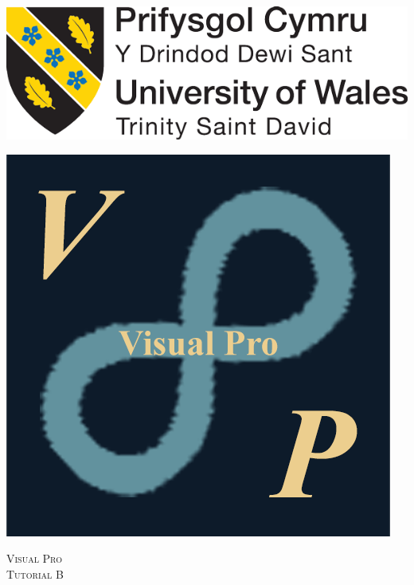 \documentclass[10pt]{article}
\begin{document}
\begin{center}																		%
\newcommand{\HRule}{\rule{\linewidth}{0.5mm}}									%
\begin{minipage}{0.48\textwidth} \begin{flushleft}
\includegraphics[scale = 0.15]{Figures/Logo/UWTSD-Logo}
\end{flushleft}\end{minipage}
\begin{minipage}{0.48\textwidth} \begin{flushright}
\includegraphics[scale = 0.4]{Figures/Logo/VP-Logo-Large}
\end{flushright}\end{minipage}

\vspace*{-1.5cm}								%
\textsc{\huge Visual Pro\\ \vspace{5px} Tutorial B}\\[1.5cm]	


\end{center}
\end{document}
